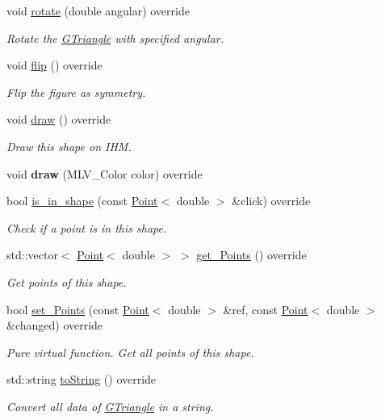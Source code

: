 \begin{DoxyCompactItemize}
void \hyperlink{classGTriangle_ae3ed75bbad4ba7fed68bc06c5834cfbe}{rotate} (double angular) override
\begin{DoxyCompactList}\small\item\em Rotate the \hyperlink{classGTriangle}{G\+Triangle} with specified angular. \end{DoxyCompactList}\item 
\mbox{\label{classGTriangle_ab223d049ce2518095201b99c8940e724}} 
void \hyperlink{classGTriangle_ab223d049ce2518095201b99c8940e724}{flip} () override
\begin{DoxyCompactList}\small\item\em Flip the figure as symmetry. \end{DoxyCompactList}\item 
\mbox{\label{classGTriangle_adb7a211b65860ce4dfcc13275cd5052d}} 
void \hyperlink{classGTriangle_adb7a211b65860ce4dfcc13275cd5052d}{draw} () override
\begin{DoxyCompactList}\small\item\em Draw this shape on I\+HM. \end{DoxyCompactList}\item 
\mbox{\label{classGTriangle_a33275fad5395d0bf0d17b1ad0c8ec393}} 
void {\bfseries draw} (M\+L\+V\+\_\+\+Color color) override
\item 
bool \hyperlink{classGTriangle_abb6f7243155483cc6de301931e87475a}{is\+\_\+in\+\_\+shape} (const \hyperlink{classPoint}{Point}$<$ double $>$ \&click) override
\begin{DoxyCompactList}\small\item\em Check if a point is in this shape. \end{DoxyCompactList}\item 
std\+::vector$<$ \hyperlink{classPoint}{Point}$<$ double $>$ $>$ \hyperlink{classGTriangle_add4581d1b52836142de5817de4d52d17}{get\+\_\+\+Points} () override
\begin{DoxyCompactList}\small\item\em Get points of this shape. \end{DoxyCompactList}\item 
bool \hyperlink{classGTriangle_adb9dae329128600209c54cc4587480ee}{set\+\_\+\+Points} (const \hyperlink{classPoint}{Point}$<$ double $>$ \&ref, const \hyperlink{classPoint}{Point}$<$ double $>$ \&changed) override
\begin{DoxyCompactList}\small\item\em Pure virtual function. Get all points of this shape. \end{DoxyCompactList}\item 
std\+::string \hyperlink{classGTriangle_a8381aeea39fac0d52ad9e0d45b791b3b}{to\+String} () override
\begin{DoxyCompactList}\small\item\em Convert all data of \hyperlink{classGTriangle}{G\+Triangle} in a string. \end{DoxyCompactList}\end{DoxyCompactItemize}
